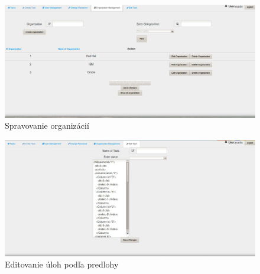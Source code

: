 {\begin{figure}[htb]
\begin{center}
\end{center}

\end{figure}

\begin{figure}[htb]

\begin{center}

\includegraphics[scale=0.5]{page4.jpg} 
\caption{Spravovanie organizácií}


\end{center}

\end{figure}

\begin{figure}[htb]

\begin{center}

\includegraphics[scale=0.5]{page6.jpg} 
\caption{Editovanie úloh podľa predlohy}


\end{center}

\end{figure}



}

